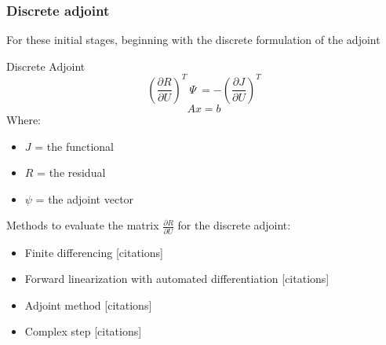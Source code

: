 \documentclass{beamer}
\begin{document}
\begin{frame}
\frametitle{Discrete adjoint}
\scriptsize
For these initial stages, beginning with the discrete formulation of the adjoint
\begin{minipage}[t][0.6\textheight]{0.75\textwidth}
\scriptsize
\vspace{-10pt}
\begin{exampleblock}{Discrete Adjoint}
\[
\left( \frac{\partial{R}}{\partial{U}} \right)^T ~\Psi~ = -\left( \frac{\partial{J}}{\partial{U}} \right)^T
\]
\[
Ax = b
\]
\tiny
Where:
\begin{itemize}
\item \textbf{$J$} = the functional
\item \textbf{$R$} =  the residual
\item \textbf{$\psi$} = the adjoint vector
\end{itemize}
\end{exampleblock}
\end{minipage}

Methods to evaluate the matrix $\frac{\partial{R}}{\partial{U}} $  for the discrete adjoint:
\begin{itemize}
\scriptsize
\item Finite differencing {\color{red}[citations]}
\item Forward linearization with automated differentiation {\color{red}[citations]}
\item Adjoint method {\color{red}[citations]}
\item Complex step {\color{red}[citations]}
\end{itemize}


\end{frame}


\end{document}
